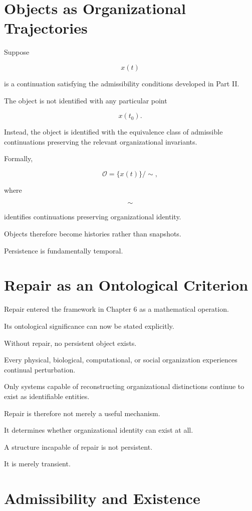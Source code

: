 \documentclass[11pt,oneside]{book}
\numberwithin{equation}{chapter}
\theoremstyle{definition}
\theoremstyle{plain}
\begin{document}
\section{Objects as Organizational Trajectories}

Suppose

\[
x(t)
\]

is a continuation satisfying the admissibility conditions developed in Part
II.

The object is not identified with any particular point

\[
x(t_0).
\]

Instead, the object is identified with the equivalence class of admissible
continuations preserving the relevant organizational invariants.

Formally,

\[
\mathcal O
=
\{x(t)\}
/
\sim,
\]

where

\[
\sim
\]

identifies continuations preserving organizational identity.

Objects therefore become histories rather than snapshots.

Persistence is fundamentally temporal.

\section{Repair as an Ontological Criterion}

Repair entered the framework in Chapter 6 as a mathematical operation.

Its ontological significance can now be stated explicitly.

Without repair, no persistent object exists.

Every physical, biological, computational, or social organization
experiences continual perturbation.

Only systems capable of reconstructing organizational distinctions continue
to exist as identifiable entities.

Repair is therefore not merely a useful mechanism.

It determines whether organizational identity can exist at all.

A structure incapable of repair is not persistent.

It is merely transient.

\section{Admissibility and Existence}
\end{document}

